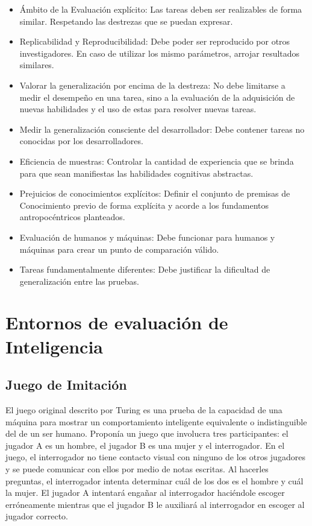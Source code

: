 \begin{itemize}
\item Ámbito de la Evaluación explícito: Las tareas deben ser realizables de forma similar. Respetando las destrezas que se puedan expresar.
\item Replicabilidad y Reproducibilidad: Debe poder ser reproducido por otros investigadores. En caso de utilizar los mismo parámetros, arrojar resultados similares.  
\item Valorar la generalización por encima de la destreza: No debe limitarse a medir el desempeño en una tarea, sino a la evaluación de la adquisición de nuevas habilidades y el uso de estas para resolver nuevas tareas.
\item Medir la generalización consciente del desarrollador: Debe contener tareas no conocidas por los desarrolladores.
\item Eficiencia de muestras: Controlar la cantidad de experiencia que se brinda para que sean manifiestas las habilidades cognitivas abstractas.
\item Prejuicios de conocimientos explícitos: Definir el conjunto de premisas de Conocimiento previo de forma explícita y acorde a los fundamentos antropocéntricos planteados.
\item Evaluación de humanos y máquinas: Debe funcionar para humanos y máquinas para crear un punto de comparación válido.
\item Tareas fundamentalmente diferentes: Debe justificar la dificultad de generalización entre las pruebas.
\end{itemize}

\section{Entornos de evaluación de Inteligencia}\label{section:state-of-the-art:inteligence-evaluation-enviroments}

\subsection{Juego de Imitación}

El juego original descrito por Turing es una prueba de la capacidad de una máquina para mostrar un comportamiento inteligente equivalente o indistinguible del de un ser humano. Proponía un juego que involucra tres participantes: el jugador A es un hombre, el jugador B es una mujer y el interrogador. En el juego, el interrogador no tiene contacto visual con ninguno de los otros jugadores y se puede comunicar con ellos por medio de notas escritas. Al hacerles preguntas, el interrogador intenta determinar cuál de los dos es el hombre y cuál la mujer. El jugador A intentará engañar al interrogador haciéndole escoger erróneamente mientras que el jugador B le auxiliará al interrogador en escoger al jugador correcto. 

